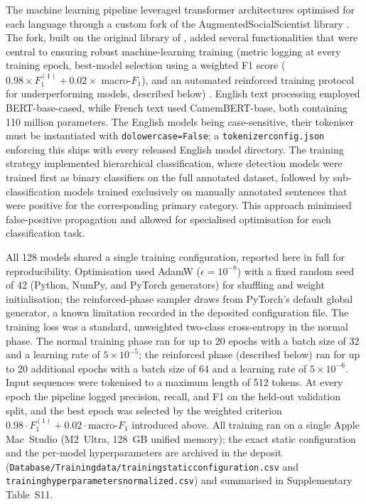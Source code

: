 \documentclass[12pt]{article}
\renewcommand\_{\texttt{\detokenize{_}\allowbreak}}
\begin{document}
The machine learning pipeline leveraged transformer architectures optimised for each language through a custom fork of the AugmentedSocialScientist library \autocite{do_augmented_2022, lemor_antoinelemoraugmentedsocialscientistfork_2025}. The fork, built on the original library of \textcite{do_augmented_2022}, added several functionalities that were central to ensuring robust machine-learning training (metric logging at every training epoch, best-model selection using a weighted F1 score ($0.98 \times F_1^{(1)} + 0.02 \times$ macro-$F_1$), and an automated reinforced training protocol for underperforming models, described below) \autocite{lemor_antoinelemoraugmentedsocialscientistfork_2025}. English text processing employed BERT-base-cased, while French text used CamemBERT-base, both containing 110 million parameters. The English models being case-sensitive, their tokeniser must be instantiated with \texttt{do\_lower\_case=False}; a \texttt{tokenizer\_config.json} enforcing this ships with every released English model directory. The training strategy implemented hierarchical classification, where detection models were trained first as binary classifiers on the full annotated dataset, followed by sub-classification models trained exclusively on manually annotated sentences that were positive for the corresponding primary category. This approach minimised false-positive propagation and allowed for specialised optimisation for each classification task.

All 128 models shared a single training configuration, reported here in full for reproducibility. Optimisation used AdamW ($\epsilon = 10^{-8}$) with a fixed random seed of 42 (Python, NumPy, and PyTorch generators) for shuffling and weight initialisation; the reinforced-phase sampler draws from PyTorch's default global generator, a known limitation recorded in the deposited configuration file. The training loss was a standard, unweighted two-class cross-entropy in the normal phase. The normal training phase ran for up to 20 epochs with a batch size of 32 and a learning rate of $5 \times 10^{-5}$; the reinforced phase (described below) ran for up to 20 additional epochs with a batch size of 64 and a learning rate of $5 \times 10^{-6}$. Input sequences were tokenised to a maximum length of 512 tokens. At every epoch the pipeline logged precision, recall, and F1 on the held-out validation split, and the best epoch was selected by the weighted criterion $0.98 \cdot F_1^{(1)} + 0.02 \cdot \text{macro-}F_1$ introduced above. All training ran on a single Apple Mac~Studio (M2~Ultra, 128~GB unified memory); the exact static configuration and the per-model hyperparameters are archived in the deposit (\texttt{Database/Training\_data/training\_static\_configuration.csv} and \texttt{training\_hyperparameters\_normalized.csv}) and summarised in Supplementary Table~S11.
\end{document}
